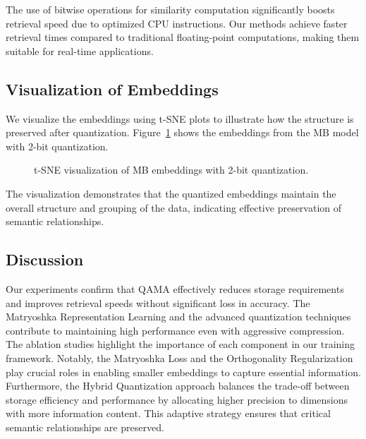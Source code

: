 The use of bitwise operations for similarity computation significantly boosts retrieval speed due to optimized CPU instructions. Our methods achieve faster retrieval times compared to traditional floating-point computations, making them suitable for real-time applications.

\subsection{Visualization of Embeddings}
\label{sec:visualization}
We visualize the embeddings using t-SNE plots to illustrate how the structure is preserved after quantization. Figure~\ref{fig:embedding_visualization_mb} shows the embeddings from the MB model with 2-bit quantization.

\begin{figure}[ht]
    \centering
    \caption{t-SNE visualization of MB embeddings with 2-bit quantization.}
    \label{fig:embedding_visualization_mb}
\end{figure}

The visualization demonstrates that the quantized embeddings maintain the overall structure and grouping of the data, indicating effective preservation of semantic relationships.

\subsection{Discussion}
Our experiments confirm that QAMA effectively reduces storage requirements and improves retrieval speeds without significant loss in accuracy. 
The Matryoshka Representation Learning and the advanced quantization techniques contribute to maintaining high performance even with aggressive compression.
The ablation studies highlight the importance of each component in our training framework. 
Notably, the Matryoshka Loss and the Orthogonality Regularization play crucial roles in enabling smaller embeddings to capture essential information.
Furthermore, the Hybrid Quantization approach balances the trade-off between storage efficiency and performance by allocating higher precision to dimensions with more information content. 
This adaptive strategy ensures that critical semantic relationships are preserved.
